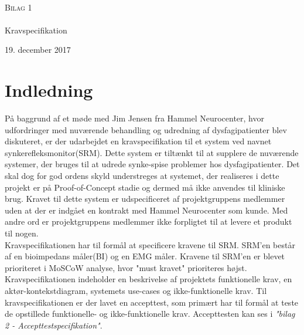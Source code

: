 

\begin{titlingpage}
\begin{center}

~ \\[3cm]


\textsc{\LARGE Bilag 1}\\[1.5cm]


\noindent\makebox[\linewidth]{\rule{\textwidth}{0.4pt}}\\
[0.5cm]{\Huge Kravspecifikation}
\noindent\makebox[\linewidth]{\rule{\textwidth}{0.4pt}}
\end{center}
\vfill
\begin{center}
{\large 19. december 2017}
\end{center}
\end{titlingpage}

\newpage
\tableofcontents*


\chapter{Indledning}
På baggrund af et møde med Jim Jensen fra Hammel Neurocenter, hvor udfordringer med nuværende behandling og udredning af dysfagipatienter blev diskuteret, er der udarbejdet en kravspecifikation til et system ved navnet synkerefleksmonitor(SRM). Dette system er tiltænkt til at supplere de nuværende systemer, der bruges til at udrede synke-spise problemer hos dysfagipatienter. Det skal dog for god ordens skyld understreges at systemet, der realiseres i dette projekt er på Proof-of-Concept stadie og dermed må ikke anvendes til kliniske brug. Kravet til dette system er udspecificeret af projektgruppens medlemmer uden at der er indgået en kontrakt med Hammel Neurocenter som kunde. Med andre ord er projektgruppens medlemmer ikke forpligtet til at levere et produkt til nogen. \\


Kravspecifikationen har til formål at specificere
kravene til SRM. SRM'en består af en bioimpedans måler(BI) og en EMG måler. Kravene til SRM'en er blevet prioriteret i MoSCoW analyse, hvor "must kravet" prioriteres højst. Kravspecifikationen indeholder en beskrivelse af projektets funktionelle krav, en aktør-kontekstdiagram, systemets use-cases og ikke-funktionelle krav. Til  kravspecifikationen er der lavet en accepttest, som primært har til formål at teste
de opstillede funktionelle- og ikke-funktionelle krav. Accepttesten kan ses i \textit{"bilag 2 - Accepttestspecifikation"}.



